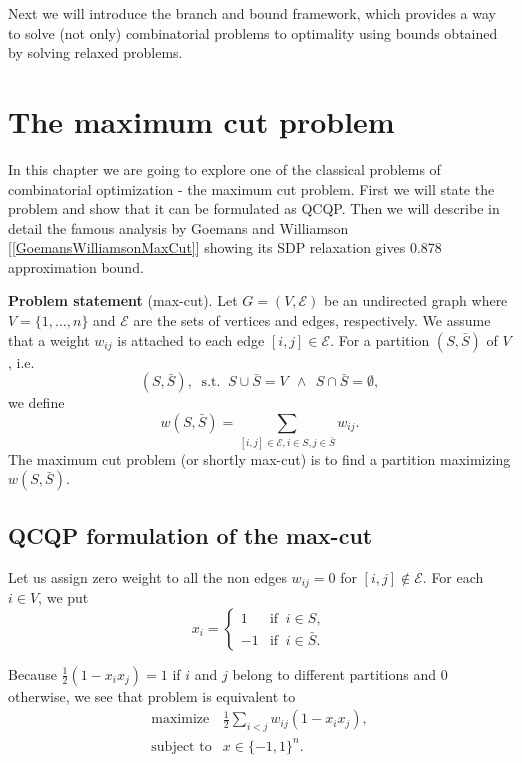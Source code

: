 \documentclass[12pt]{book}
\theoremstyle{definition}
\begin{document}
Next we will introduce the branch and bound framework, which provides a way to solve (not only) combinatorial problems to optimality using bounds obtained by solving relaxed problems.


\section{The maximum cut problem}


 In this chapter we are going to explore one of the classical problems of combinatorial optimization - the maximum cut problem. First we will state the problem and show that it can be formulated as QCQP. Then we will describe in detail the famous analysis by Goemans and Williamson [\ref{GoemansWilliamsonMaxCut}] showing its SDP relaxation gives 0.878 approximation bound.



{\bf Problem statement} (max-cut).
Let $G = (V, \mathcal{E} )$ be an undirected graph where $V = \{1, \dots , n\}$ and $\mathcal{E}$ are the sets of vertices
and edges, respectively. We assume that a weight $w_{ij}$ is attached to each edge $[i, j] \in \mathcal{E}$.
For a partition $(S, \bar{S})$ of $V$, i.e. 
\begin{equation}
(S, \bar{S}), \ \mbox{ s.t. } \ S \cup \bar{S} = V \ \ \wedge \ \ S\cap \bar{S} = \emptyset,
\end{equation}
 we define
\begin{equation}
w(S,\bar{S}) = \sum_{[i,j]\in\mathcal{E}, i\in S, j\in \bar{S}} w_{ij}.
\end{equation}
The maximum cut problem (or shortly max-cut) is to find a partition maximizing $w(S,\bar{S})$.

\subsection{QCQP formulation of the max-cut}
Let us assign zero weight to all the non edges $w_{ij} = 0$ for $[i,j]\notin \mathcal{E}$.
For each $i \in V$, we put
\begin{equation}
x_i = \left\lbrace \begin{array}{rl}
1 & \mbox{if } \ i \in S, \\
-1 & \mbox{if } \ i \in \bar{S}.
\end{array}\right.
\end{equation}

Because $\frac{1}{2}(1-x_ix_j ) = 1$ if $i$ and $j$ belong to different partitions and 0 otherwise, we see that
problem is equivalent to 
\begin{equation}
\label{maxcut2}
\begin{array}{ll}
\mbox{maximize} & \frac{1}{2}\sum_{i<j}w_{ij}(1-x_ix_j ), \\
\mbox{subject to} &  x \in \{-1,1\}^n.
\end{array}
\end{equation}
\end{document}
